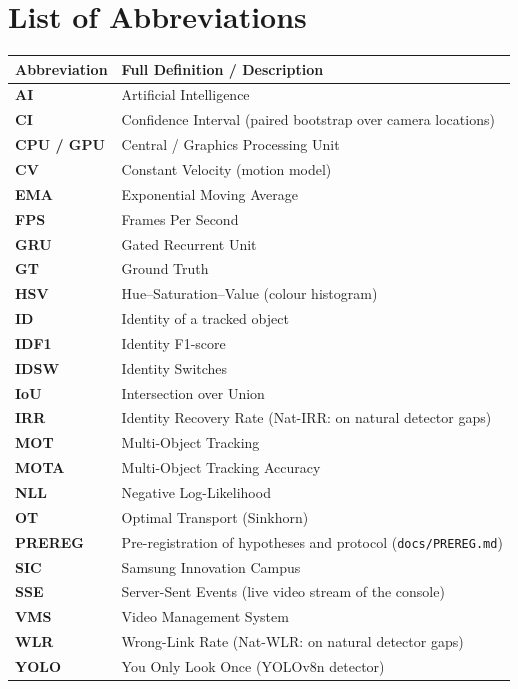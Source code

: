 \documentclass{sicaireport}
\begin{document}
\chapter*{List of Abbreviations}
\begin{table}[htbp]
    \renewcommand{\arraystretch}{1.4}
    \begin{tabularx}{\textwidth}{p{3.5cm} X}
        \toprule
        \textbf{Abbreviation} & \textbf{Full Definition / Description} \\
        \midrule
        \textbf{AI} & Artificial Intelligence \\
        \textbf{CI} & Confidence Interval (paired bootstrap over camera locations) \\
        \textbf{CPU / GPU} & Central / Graphics Processing Unit \\
        \textbf{CV} & Constant Velocity (motion model) \\
        \textbf{EMA} & Exponential Moving Average \\
        \textbf{FPS} & Frames Per Second \\
        \textbf{GRU} & Gated Recurrent Unit \\
        \textbf{GT} & Ground Truth \\
        \textbf{HSV} & Hue--Saturation--Value (colour histogram) \\
        \textbf{ID} & Identity of a tracked object \\
        \textbf{IDF1} & Identity F1-score \\
        \textbf{IDSW} & Identity Switches \\
        \textbf{IoU} & Intersection over Union \\
        \textbf{IRR} & Identity Recovery Rate (Nat-IRR: on natural detector gaps) \\
        \textbf{MOT} & Multi-Object Tracking \\
        \textbf{MOTA} & Multi-Object Tracking Accuracy \\
        \textbf{NLL} & Negative Log-Likelihood \\
        \textbf{OT} & Optimal Transport (Sinkhorn) \\
        \textbf{PREREG} & Pre-registration of hypotheses and protocol (\texttt{docs/PREREG.md}) \\
        \textbf{SIC} & Samsung Innovation Campus \\
        \textbf{SSE} & Server-Sent Events (live video stream of the console) \\
        \textbf{VMS} & Video Management System \\
        \textbf{WLR} & Wrong-Link Rate (Nat-WLR: on natural detector gaps) \\
        \textbf{YOLO} & You Only Look Once (YOLOv8n detector) \\
        \bottomrule
    \end{tabularx}
\end{table}
\clearpage
\end{document}
